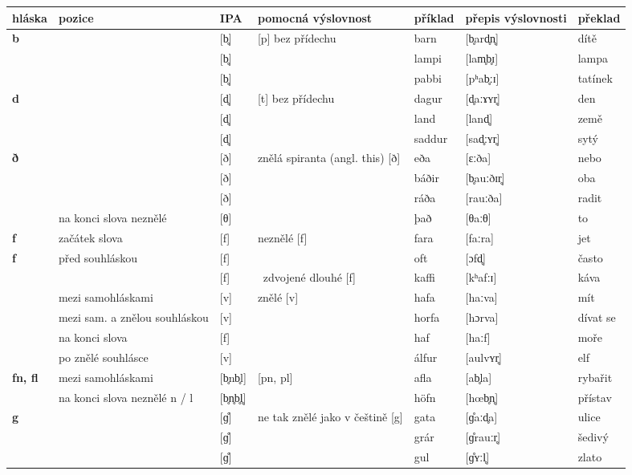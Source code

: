 \begin{longtable}{>{\bfseries}lX>{\IPAFont}lXl>{\IPAFont}ll}
\toprule
  \textbf{hláska} & \textbf{pozice} & \normalfont\textbf{IPA} & \textbf{pomocná výslovnost} & \textbf{příklad} & \normalfont\textbf{přepis výslovnosti} & \textbf{překlad} \\
\midrule
\endhead
b &  & {[b̥]} & [p] bez přídechu & barn & {[b̥ard̥n̥]} & dítě \\ 
 &  & {[b̥]} &   & lampi & {[lam̥b̥ɪ]} & lampa \\ 
 &  & {[b̥]} &   & pabbi & {[pʰab̥ːɪ]} & tatínek \\ 
d &  & {[d̥]} & [t] bez přídechu & dagur & {[d̥aːɤʏr̥]} & den \\ 
 &  & {[d̥]} &   & land & {[land̥]} & země \\ 
 &  & {[d̥]} &   & saddur & {[sad̥ːʏr̥]} & sytý \\ 
ð &  & {[ð]} & znělá spiranta (angl. this) [ð] & eða & {[ɛːða]} & nebo \\ 
 &  & {[ð]} &  & báðir & {[b̥auːðɪr̥]} & oba \\ 
 &  & {[ð]} &   & ráða & {[rauːða]} & radit \\ 
 & na konci slova neznělé  & {[θ]} &   & það & {[θaːθ]} & to \\ 
f  & začátek slova & {[f]} & neznělé [f] & fara & {[faːra]} & jet \\ 
f & před souhláskou & {[f]} &   & oft & {[ɔfd̥]} & často \\ 
 &  & {[f]} &  zdvojené dlouhé [f] & kaffi & {[kʰafːɪ]} & káva \\ 
 & mezi samohláskami & {[v]} & znělé [v] & hafa & {[haːva]} & mít \\ 
 & mezi sam. a znělou souhláskou & {[v]} &   & horfa & {[hɔrva]} & dívat se \\ 
 & na konci slova & {[f]} &   & haf  & {[haːf]} & moře \\ 
 & po znělé souhlásce & {[v]} &   & álfur & {[aulvʏr̥]} & elf \\ 
fn, fl & mezi samohláskami & {[b̥nb̥l]} & [pn, pl] & afla & {[ab̥la]} & rybařit \\ 
 & na konci slova neznělé n / l & {[b̥n̥b̥l̥]} &   & höfn & {[h\oe b̥n̥]} & přístav \\ 
g &  & {[ɡ̊]} & ne tak znělé jako v češtině [g] & gata & {[ɡ̊aːd̥a]} & ulice \\ 
 &  & {[ɡ̊]} &   & grár & {[ɡ̊rauːr̥]} & šedivý \\ 
 &  & {[ɡ̊]} &   & gul & {[ɡ̊ʏːl̥]} & zlato \\ 

\end{longtable}
